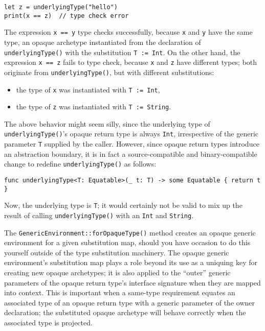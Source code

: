\documentclass[../generics]{subfiles}
\begin{document}
\begin{example}
\begin{Verbatim}
let z = underlyingType("hello")
print(x == z)  // type check error
\end{Verbatim}
The expression \texttt{x == y} type checks successfully, because \texttt{x} and \texttt{y} have the same type, an opaque archetype instantiated from the declaration of \texttt{underlyingType()} with the substitution \texttt{T := Int}. On the other hand, the expression \texttt{x == z} fails to type check, because \texttt{x} and \texttt{z} have different types; both originate from \texttt{underlyingType()}, but with different substitutions:
\begin{itemize}
\item the type of \texttt{x} was instantiated with \texttt{T := Int},
\item the type of \texttt{z} was instantiated with \texttt{T := String}.
\end{itemize}
\end{example}
\begin{example}
The above behavior might seem silly, since the underlying type of \texttt{underlyingType()}'s opaque return type is always \texttt{Int}, irrespective of the generic parameter \texttt{T} supplied by the caller. However, since opaque return types introduce an abstraction boundary, it is in fact a source-compatible and binary-compatible change to redefine \texttt{underlyingType()} as follows:
\begin{Verbatim}
func underlyingType<T: Equatable>(_ t: T) -> some Equatable { return t }
\end{Verbatim}
Now, the underlying type is \texttt{T}; it would certainly not be valid to mix up the result of calling \texttt{underlyingType()} with an \texttt{Int} and \texttt{String}.
\end{example}

The \texttt{GenericEnvironment::forOpaqueType()} method creates an opaque generic environment for a given substitution map, should you have occasion to do this yourself outside of the type substitution machinery. The opaque generic environment's substitution map plays a role beyond its use as a uniquing key for creating new opaque archetypes; it is also applied to the ``outer'' generic parameters of the opaque return type's interface signature when they are mapped into context. This is important when a same-type requirement equates an associated type of an opaque return type with a generic parameter of the owner declaration; the substituted opaque archetype will behave correctly when the associated type is projected.
\end{document}
